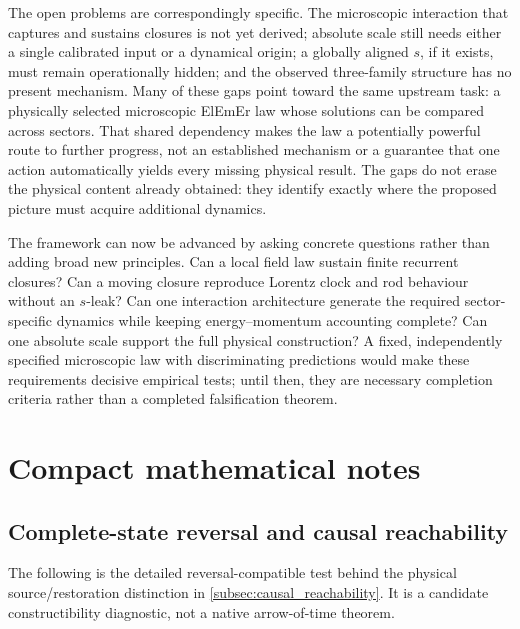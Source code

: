 \documentclass[11pt]{article}
\theoremstyle{definition}
\newcommand{\ElEmEr}{\mbox{ElEmEr}}
\begin{document}
The open problems are correspondingly specific.  The microscopic interaction that
captures and sustains closures is not yet derived; absolute scale still needs either a
single calibrated input or a dynamical origin; a globally aligned $s$, if it exists, must
remain operationally hidden; and the observed three-family structure has no present
mechanism.  Many of these gaps point toward the same upstream task: a physically
selected microscopic \ElEmEr{} law whose solutions can be compared across
sectors.  That shared dependency makes the law a potentially powerful route
to further progress, not an established mechanism or a guarantee that one
action automatically yields every missing physical result.  The gaps do not
erase the physical content already obtained: they identify exactly where the
proposed picture must acquire additional dynamics.

The framework can now be advanced by asking concrete questions rather than adding broad
new principles.  Can a local field law sustain finite recurrent closures?  Can a moving
closure reproduce Lorentz clock and rod behaviour without an $s$-leak?  Can one
interaction architecture generate the required sector-specific dynamics while keeping
energy--momentum accounting complete?  Can one absolute scale support the full physical
construction?  A fixed, independently specified microscopic law with discriminating
predictions would make these requirements decisive empirical tests; until then,
they are necessary completion criteria rather than a completed falsification theorem.

\newpage


\appendix

\section{Compact mathematical notes}
\label{app:math}

\subsection{Complete-state reversal and causal reachability}
\label{subsec:complete-state-reversal}
The following is the detailed reversal-compatible test behind the physical
source/restoration distinction in \cref{subsec:causal_reachability}.  It is a
candidate constructibility diagnostic, not a native arrow-of-time theorem.
\end{document}
